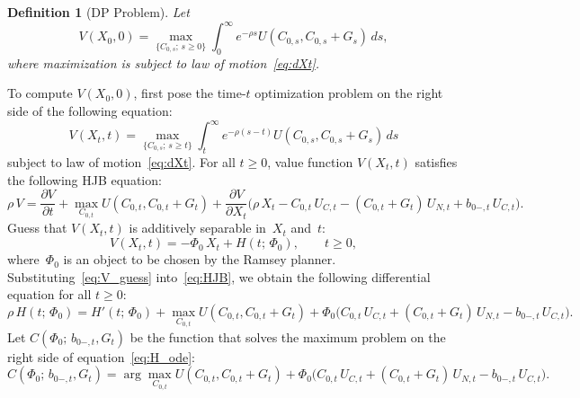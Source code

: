 \documentclass[12pt]{article}
\newtheorem{definition}{Definition}
\begin{document}
{\begin{definition}[DP Problem]\label{def:DP}
	Let %
	\begin{equation}\label{eq:DP_obj}
	V(X_0,0) =\max_{\{C_{0,s};\, s \ge 0\}} \int_0^\infty e^{-\rho s} U(C_{0,s}, C_{0,s}+G_s)\, ds,
	\end{equation}
	where maximization is subject to law of motion~\eqref{eq:dXt}.
\end{definition}

To compute  $V(X_0,0)$, first pose the  time-$t$ optimization problem on the right side of the following equation:
\begin{equation}\label{eq:DP_t}
V(X_t,t) = \max_{\{C_{0,s};\, s \ge t\}} \int_t^\infty e^{-\rho(s-t)} U(C_{0,s}, C_{0,s}+G_s)\, ds
\end{equation}
subject to law of motion~\eqref{eq:dXt}. %
For all $t \ge 0$,  value function $V(X_t,t)$ %
satisfies the following HJB equation:
\begin{equation}\label{eq:HJB}
\rho\, V = \frac{\partial V}{\partial t} + \max_{C_{0,t}} U(C_{0,t}, C_{0,t}+G_t) + \frac{\partial V}{\partial X_t}\bigl(\rho\, X_t - C_{0,t}\, U_{C,t} - (C_{0,t}+G_t)\, U_{N,t} + b_{0-,t}\, U_{C,t}\bigr).
\end{equation}
Guess %
that $V(X_t,t)$ is additively separable in~$X_t$ and~$t$:
\begin{equation}\label{eq:V_guess}
V(X_t,t) = -\Phi_0\, X_t + H(t;\, \Phi_0), \qquad t \ge 0,
\end{equation}
where~$\Phi_0$ is an object to be chosen by the Ramsey planner. Substituting~\eqref{eq:V_guess} into~\eqref{eq:HJB}, we obtain the following differential equation for all $t \ge 0$:
\begin{equation}\label{eq:H_ode}
\rho\, H(t;\, \Phi_0) = H'(t;\, \Phi_0) + \max_{C_{0,t}} U(C_{0,t}, C_{0,t}+G_t) + \Phi_0\bigl(C_{0,t}\, U_{C,t} + (C_{0,t}+G_t)\, U_{N,t} - b_{0-,t}\, U_{C,t}\bigr).
\end{equation}
Let $C(\Phi_0;\, b_{0-,t}, G_t)$  %
be the function that solves the maximum problem on the right side of equation~\eqref{eq:H_ode}:
\begin{equation}\label{eq:C_given_Phi}
C(\Phi_0;\, b_{0-,t}, G_t) = \arg\max_{C_{0,t}} U(C_{0,t}, C_{0,t}+G_t) + \Phi_0\bigl(C_{0,t}\, U_{C,t} + (C_{0,t}+G_t)\, U_{N,t} - b_{0-,t}\, U_{C,t}\bigr).
\end{equation}

}
\end{document}
